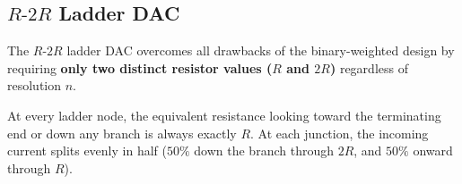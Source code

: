 \documentclass[12pt,a4paper]{article}
\begin{document}
\subsection{\texorpdfstring{$R\text{-}2R$}{R-2R} Ladder DAC}
The $R\text{-}2R$ ladder DAC overcomes all drawbacks of the binary-weighted design by requiring \textbf{only two distinct resistor values ($R$ and $2R$)} regardless of resolution $n$.

\begin{tcolorbox}[defbox, title={\textbf{Thevenin Resistance Principle of the $R\text{-}2R$ Ladder}}]
At every ladder node, the equivalent resistance looking toward the terminating end or down any branch is always exactly $R$. At each junction, the incoming current splits evenly in half ($50\%$ down the branch through $2R$, and $50\%$ onward through $R$).
\end{tcolorbox}
\end{document}
